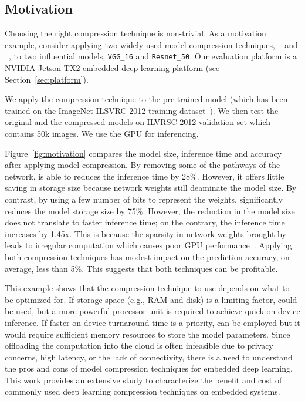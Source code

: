 \subsection{Motivation}
Choosing the right compression technique is non-trivial. As a motivation example, consider applying two widely used model compression
techniques, \pruning~\cite{manessi2017automated} and \dquantization~\cite{}, to two influential \CNN models, \texttt{VGG\_16} 	and
\texttt{Resnet\_50}. Our evaluation platform is a NVIDIA Jetson TX2 embedded deep learning platform (see Section~\ref{sec:platform}).

 We apply the compression technique to the pre-trained model (which has been trained on the ImageNet ILSVRC 2012
training dataset~\cite{}). We then test the original and the compressed models on ILVRSC 2012 validation set which contains 50k images.
 We use the GPU for
inferencing.

 Figure~\ref{fig:motivation} compares the model size, inference time and accuracy after applying model
compression. By removing some of the pathways of the network, \pruning is able to reduces the inference time by 28\%. However, it offers
little saving in storage size because network weights still deaminate the model size. By contrast, by using a few number of bits to
represent the weights, \quantization significantly reduces the model storage size by 75\%. However, the reduction in the model size does
not translate to faster inference time; on the contrary, the inference time increases by 1.45x. This is because the sparsity in network
weights brought by \quantization leads to irregular computation which causes poor GPU performance~\cite{}. Applying both compression
techniques has modest impact on the prediction accuracy, on average, less than 5\%. This suggests that both techniques can be profitable.

 This example shows that the compression technique to use depends on what to be optimized for. If storage
space (e.g., RAM and disk) is a limiting factor, \quantization could be used, but a more powerful processor unit is required to achieve
quick on-device inference. If faster on-device turnaround time is a priority, \pruning can be employed but it would require sufficient
memory resources to store the model parameters.  Since offloading the computation into the cloud is often infeasible due to privacy
concerns, high latency, or the lack of connectivity, there is a need to understand the pros and cons of model compression techniques for
embedded deep learning. This work provides an extensive study to characterize the benefit and cost of commonly used deep learning
compression techniques on embedded systems.
